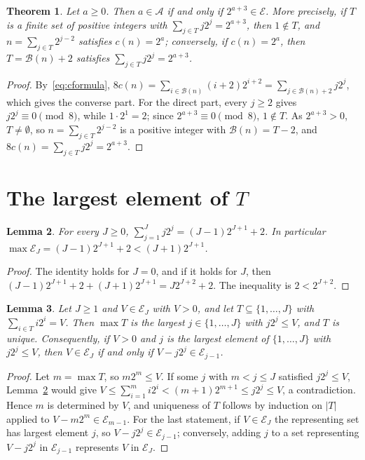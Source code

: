\documentclass[11pt]{amsart}
\newtheorem{Theorem}{Theorem}[section]
\newtheorem{Lemma}[Theorem]{Lemma}
\theoremstyle{definition}
\begin{document}
\begin{Theorem}
\label{thm:equiv}
Let $a\ge0$. Then $a\in\mathcal{A}$ if and only if $2^{a+3}\in\mathcal{E}$. More precisely, if $T$ is a finite set of positive integers with $\sum_{j\in T}j2^j=2^{a+3}$, then $1\notin T$, and $n=\sum_{j\in T}2^{j-2}$ satisfies $c(n)=2^a$; conversely, if $c(n)=2^a$, then $T=\mathcal{B}(n)+2$ satisfies $\sum_{j\in T}j2^j=2^{a+3}$.
\end{Theorem}
\begin{proof}
By~\eqref{eq:cformula}, $8c(n)=\sum_{i\in\mathcal{B}(n)}(i+2)2^{i+2}=\sum_{j\in\mathcal{B}(n)+2}j2^j$, which gives the converse part. For the direct part, every $j\ge2$ gives $j2^j\equiv0\pmod8$, while $1\cdot2^1=2$; since $2^{a+3}\equiv0\pmod 8$, $1\notin T$. As $2^{a+3}>0$, $T\neq\emptyset$, so $n=\sum_{j\in T}2^{j-2}$ is a positive integer with $\mathcal{B}(n)=T-2$, and $8c(n)=\sum_{j\in T}j2^j=2^{a+3}$.
\end{proof}

\section{The largest element of $T$}
\label{sec:leading}
\begin{Lemma}
\label{lem:sum}
For every $J\ge0$, $\sum_{j=1}^{J}j2^j=(J-1)2^{J+1}+2$. In particular $\max\mathcal{E}_J=(J-1)2^{J+1}+2<(J+1)2^{J+1}$.
\end{Lemma}
\begin{proof}
The identity holds for $J=0$, and if it holds for $J$, then $(J-1)2^{J+1}+2+(J+1)2^{J+1}=J2^{J+2}+2$. The inequality is $2<2^{J+2}$.
\end{proof}

\begin{Lemma}
\label{lem:greedy}
Let $J\ge1$ and $V\in\mathcal{E}_J$ with $V>0$, and let $T\subseteq\{1,\dots,J\}$ with $\sum_{i\in T}i2^i=V$. Then $\max T$ is the largest $j\in\{1,\dots,J\}$ with $j2^j\le V$, and $T$ is unique. Consequently, if $V>0$ and $j$ is the largest element of $\{1,\dots,J\}$ with $j2^j\le V$, then $V\in\mathcal{E}_J$ if and only if $V-j2^j\in\mathcal{E}_{j-1}$.
\end{Lemma}
\begin{proof}
Let $m=\max T$, so $m2^m\le V$. If some $j$ with $m<j\le J$ satisfied $j2^j\le V$, Lemma~\ref{lem:sum} would give $V\le\sum_{i=1}^{m}i2^i<(m+1)2^{m+1}\le j2^j\le V$, a contradiction. Hence $m$ is determined by $V$, and uniqueness of $T$ follows by induction on $|T|$ applied to $V-m2^m\in\mathcal{E}_{m-1}$. For the last statement, if $V\in\mathcal{E}_J$ the representing set has largest element $j$, so $V-j2^j\in\mathcal{E}_{j-1}$; conversely, adding $j$ to a set representing $V-j2^j$ in $\mathcal{E}_{j-1}$ represents $V$ in $\mathcal{E}_J$.
\end{proof}
\end{document}
